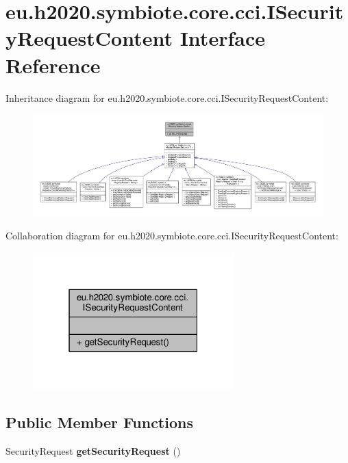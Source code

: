 \hypertarget{interfaceeu_1_1h2020_1_1symbiote_1_1core_1_1cci_1_1ISecurityRequestContent}{}\section{eu.\+h2020.\+symbiote.\+core.\+cci.\+I\+Security\+Request\+Content Interface Reference}
\label{interfaceeu_1_1h2020_1_1symbiote_1_1core_1_1cci_1_1ISecurityRequestContent}


Inheritance diagram for eu.\+h2020.\+symbiote.\+core.\+cci.\+I\+Security\+Request\+Content\+:
\nopagebreak
\begin{figure}[H]
\begin{center}
\leavevmode
\includegraphics[width=350pt]{interfaceeu_1_1h2020_1_1symbiote_1_1core_1_1cci_1_1ISecurityRequestContent__inherit__graph}
\end{center}
\end{figure}


Collaboration diagram for eu.\+h2020.\+symbiote.\+core.\+cci.\+I\+Security\+Request\+Content\+:\nopagebreak
\begin{figure}[H]
\begin{center}
\leavevmode
\includegraphics[width=220pt]{interfaceeu_1_1h2020_1_1symbiote_1_1core_1_1cci_1_1ISecurityRequestContent__coll__graph}
\end{center}
\end{figure}
\subsection*{Public Member Functions}
\begin{DoxyCompactItemize}
\item 
\mbox{\label{interfaceeu_1_1h2020_1_1symbiote_1_1core_1_1cci_1_1ISecurityRequestContent_af1bb20cb8816623326d34865ffbf64d3}} 
Security\+Request {\bfseries get\+Security\+Request} ()
\end{DoxyCompactItemize}



